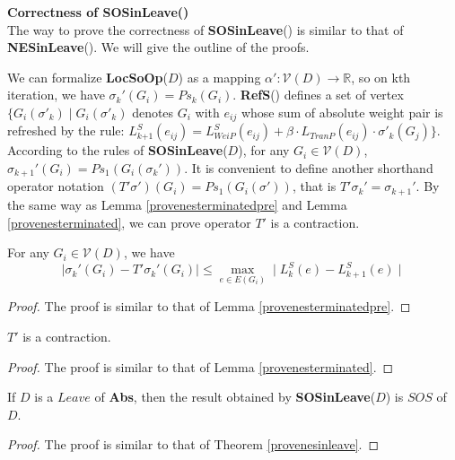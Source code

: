 \documentclass{acm_proc_article-sp}
\begin{document}
\textbf{Correctness of \textbf{SOSinLeave}()}\\
The way to prove the correctness of \textbf{SOSinLeave}() is similar to that of \textbf{NESinLeave}(). We will give the outline of the proofs.

We can formalize \textbf{LocSoOp}($D$) as a mapping $\alpha': \mathcal{V}(D)\rightarrow \mathds{R}$, so on kth iteration, we have $\sigma_{k}'(G_{\textit{i}})=Ps_{k}(G_\textit{i})$. \textbf{RefS}() defines a set of vertex $\{G_{\textit{i}}(\sigma'_{k})\mid G_{\textit{i}}(\sigma'_{k})$ denotes $G_{\textit{i}}$ with $e_{\textit{ij}}$ whose sum of absolute weight pair is refreshed by the rule: $L_{\textit{k+1}}^{S}(e_{\textit{ij}})=L_{\textit{WeiP}}^{S} (e_{\textit{ij}})+ \beta\cdot L_{\textit{TranP}}(e_{\textit{ij}})\cdot \sigma'_{k}(G_{\textit{j}})\}$. According to the rules of  \textbf{SOSinLeave}($D$), for any $G_{\textit{i}}\in \mathcal{V}(D)$,  $\sigma_{k+1}'(G_{\textit{i}})=Ps_{1}(G_{i}(\sigma_{k}'))$. It is convenient to define another shorthand operator notation $(T'\sigma')(G_{\textit{i}})=Ps_{1}(G_{i}(\sigma'))$, that is $T'\sigma_{k}'=\sigma_{k+1}'$. By the same way as Lemma \ref{provenesterminatedpre} and Lemma \ref{provenesterminated}, we can prove operator $T'$ is a contraction.

\begin{Lemma}
\label{provesosterminatedpre}
For any $G_{\textit{i}}\in \mathcal{V}(D)$, we have\\
$$\mid \sigma_{k}'(G_{\textit{i}})- T'\sigma_{k}'(G_{\textit{i}})\mid \leq \underset{e\in E(G_{\textit{i}})}{\max} \mid L_{k}^S(e)- L_{k+1}^S(e)\mid$$
\end{Lemma}

\begin{proof}
The proof is similar to that of Lemma \ref{provenesterminatedpre}.
\end{proof}

\begin{Lemma}
\label{provesosterminated}
$T'$ is a contraction.
\end{Lemma}

\begin{proof}
The proof is similar to that of Lemma \ref{provenesterminated}.
\end{proof}
\begin{Theorem}
If $D$ is a $\textit{Leave}$ of \textbf{Abs}, then the result obtained by \textbf{SOSinLeave}($D$) is $\textit{SOS}$ of $D$.
\end{Theorem}
\begin{proof}
The proof is similar to that of Theorem \ref{provenesinleave}.
\end{proof}
\end{document}
